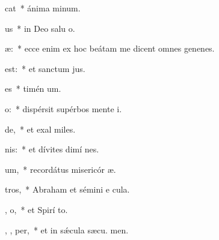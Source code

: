 \item {}cat~* ánima  minum.
\item {}   us~* in Deo salu o.
\item {}    æ:~* ecce enim ex hoc beátam me dicent omnes genenes.
\item {}      est:~* et sanctum  jus.
\item {}      es~* timén um.
\item {}    o:~* dispérsit supérbos mente  i.
\item {}   de,~* et exal miles.
\item {}  nis:~* et dívites dimí nes.
\item {}   um,~* recordátus misericór æ.
\item {}     tros,~* Abraham et sémini e  cula.
\item {} ,  o,~* et Spirí to.
\item {}   ,  ,  per,~* et in sǽcula sæcu. men.
